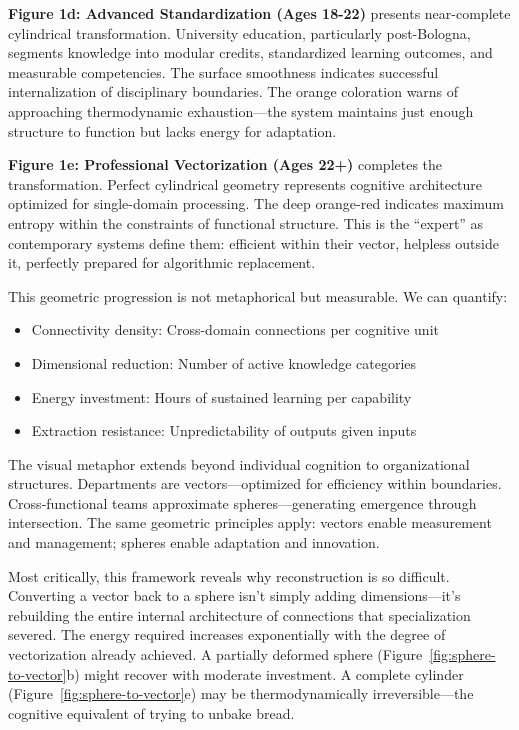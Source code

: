 \textbf{Figure 1d: Advanced Standardization (Ages 18-22)} presents near-complete cylindrical transformation. University education, particularly post-Bologna, segments knowledge into modular credits, standardized learning outcomes, and measurable competencies. The surface smoothness indicates successful internalization of disciplinary boundaries. The orange coloration warns of approaching thermodynamic exhaustion---the system maintains just enough structure to function but lacks energy for adaptation.

\textbf{Figure 1e: Professional Vectorization (Ages 22+)} completes the transformation. Perfect cylindrical geometry represents cognitive architecture optimized for single-domain processing. The deep orange-red indicates maximum entropy within the constraints of functional structure. This is the ``expert'' as contemporary systems define them: efficient within their vector, helpless outside it, perfectly prepared for algorithmic replacement.

This geometric progression is not metaphorical but measurable. We can quantify:
\begin{itemize}
\item Connectivity density: Cross-domain connections per cognitive unit
\item Dimensional reduction: Number of active knowledge categories
\item Energy investment: Hours of sustained learning per capability
\item Extraction resistance: Unpredictability of outputs given inputs
\end{itemize}

The visual metaphor extends beyond individual cognition to organizational structures. Departments are vectors---optimized for efficiency within boundaries. Cross-functional teams approximate spheres---generating emergence through intersection. The same geometric principles apply: vectors enable measurement and management; spheres enable adaptation and innovation.

Most critically, this framework reveals why reconstruction is so difficult. Converting a vector back to a sphere isn't simply adding dimensions---it's rebuilding the entire internal architecture of connections that specialization severed. The energy required increases exponentially with the degree of vectorization already achieved. A partially deformed sphere (Figure~\ref{fig:sphere-to-vector}b) might recover with moderate investment. A complete cylinder (Figure~\ref{fig:sphere-to-vector}e) may be thermodynamically irreversible---the cognitive equivalent of trying to unbake bread.

